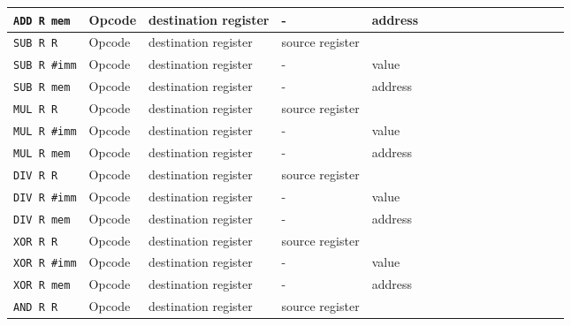 \documentclass[10pt,a4paper]{scrartcl}
\newcommand{\code}[1]{\texttt{#1}}
\begin{document}
\begin{tabular}{|l|c|c|c|c|c|c|c|c|c|c|c|c|c|c|c|c|c|c|c|c|c|c|c|c|c|c|c|c|c|c|c|c|}
    \code{ADD R mem} & \multicolumn{8}{|l|}{Opcode} & \multicolumn{4}{|l|}{destination register} & \multicolumn{4}{|l|}{-} & \multicolumn{16}{|l|}{address} \\ \hline
    \code{SUB R R} & \multicolumn{8}{|l|}{Opcode} & \multicolumn{4}{|l|}{destination register} & \multicolumn{4}{|l|}{source register} \\ \hline
    \code{SUB R \#imm} & \multicolumn{8}{|l|}{Opcode} & \multicolumn{4}{|l|}{destination register} & \multicolumn{4}{|l|}{-} & \multicolumn{16}{|l|}{value} \\ \hline
    \code{SUB R mem} & \multicolumn{8}{|l|}{Opcode} & \multicolumn{4}{|l|}{destination register} & \multicolumn{4}{|l|}{-} & \multicolumn{16}{|l|}{address} \\ \hline
    \code{MUL R R} & \multicolumn{8}{|l|}{Opcode} & \multicolumn{4}{|l|}{destination register} & \multicolumn{4}{|l|}{source register} \\ \hline
    \code{MUL R \#imm} & \multicolumn{8}{|l|}{Opcode} & \multicolumn{4}{|l|}{destination register} & \multicolumn{4}{|l|}{-} & \multicolumn{16}{|l|}{value} \\ \hline
    \code{MUL R mem} & \multicolumn{8}{|l|}{Opcode} & \multicolumn{4}{|l|}{destination register} & \multicolumn{4}{|l|}{-} & \multicolumn{16}{|l|}{address} \\ \hline
    \code{DIV R R} & \multicolumn{8}{|l|}{Opcode} & \multicolumn{4}{|l|}{destination register} & \multicolumn{4}{|l|}{source register} \\ \hline
    \code{DIV R \#imm} & \multicolumn{8}{|l|}{Opcode} & \multicolumn{4}{|l|}{destination register} & \multicolumn{4}{|l|}{-} & \multicolumn{16}{|l|}{value} \\ \hline
    \code{DIV R mem} & \multicolumn{8}{|l|}{Opcode} & \multicolumn{4}{|l|}{destination register} & \multicolumn{4}{|l|}{-} & \multicolumn{16}{|l|}{address} \\ \hline
    \code{XOR R R} & \multicolumn{8}{|l|}{Opcode} & \multicolumn{4}{|l|}{destination register} & \multicolumn{4}{|l|}{source register} \\ \hline
    \code{XOR R \#imm} & \multicolumn{8}{|l|}{Opcode} & \multicolumn{4}{|l|}{destination register} & \multicolumn{4}{|l|}{-} & \multicolumn{16}{|l|}{value} \\ \hline
    \code{XOR R mem} & \multicolumn{8}{|l|}{Opcode} & \multicolumn{4}{|l|}{destination register} & \multicolumn{4}{|l|}{-} & \multicolumn{16}{|l|}{address} \\ \hline
    \code{AND R R} & \multicolumn{8}{|l|}{Opcode} & \multicolumn{4}{|l|}{destination register} & \multicolumn{4}{|l|}{source register} \\ \hline

\end{tabular}
\end{document}
